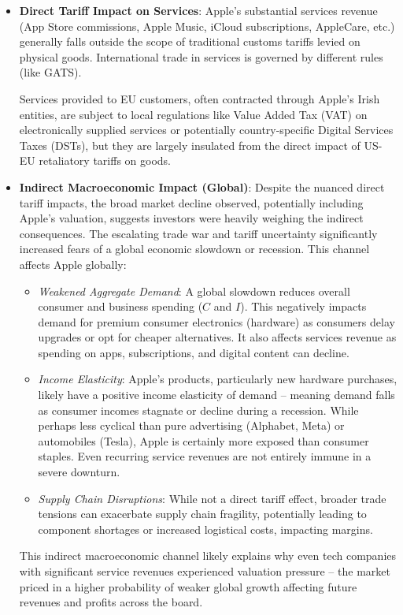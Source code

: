 \begin{itemize}
    \item \textbf{Direct Tariff Impact on Services}:
          Apple's substantial services revenue (App Store commissions, Apple Music, iCloud subscriptions, AppleCare, etc.) generally falls outside the scope of traditional customs tariffs levied on physical goods. International trade in services is governed by different rules (like GATS).

          Services provided to EU customers, often contracted through Apple's Irish entities, are subject to local regulations like Value Added Tax (VAT) on electronically supplied services or potentially country-specific Digital Services Taxes (DSTs), but they are largely insulated from the direct impact of US-EU retaliatory tariffs on goods.

    \item \textbf{Indirect Macroeconomic Impact (Global)}:
          Despite the nuanced direct tariff impacts, the broad market decline observed, potentially including Apple's valuation, suggests investors were heavily weighing the indirect consequences. The escalating trade war and tariff uncertainty significantly increased fears of a global economic slowdown or recession. This channel affects Apple globally:
          \begin{itemize}
              \item \textit{Weakened Aggregate Demand}: A global slowdown reduces overall consumer and business spending (\(C\) and \(I\)). This negatively impacts demand for premium consumer electronics (hardware) as consumers delay upgrades or opt for cheaper alternatives. It also affects services revenue as spending on apps, subscriptions, and digital content can decline.
              \item \textit{Income Elasticity}: Apple's products, particularly new hardware purchases, likely have a positive income elasticity of demand – meaning demand falls as consumer incomes stagnate or decline during a recession. While perhaps less cyclical than pure advertising (Alphabet, Meta) or automobiles (Tesla), Apple is certainly more exposed than consumer staples. Even recurring service revenues are not entirely immune in a severe downturn.
              \item \textit{Supply Chain Disruptions}: While not a direct tariff effect, broader trade tensions can exacerbate supply chain fragility, potentially leading to component shortages or increased logistical costs, impacting margins.
          \end{itemize}
          This indirect macroeconomic channel likely explains why even tech companies with significant service revenues experienced valuation pressure – the market priced in a higher probability of weaker global growth affecting future revenues and profits across the board.


\end{itemize}
